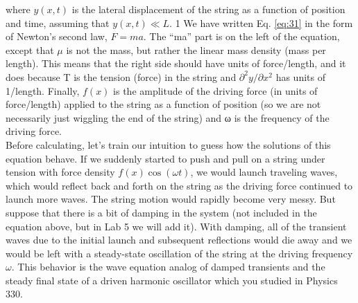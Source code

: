 		where $y(x,t)$ is the lateral displacement of the string as a function of position
and time, assuming that $y(x,t) ≪ L.$
1 We have written Eq. \eqref{eq:31} in the form of
Newton\rq s second law, $F = ma$. The “ma” part is on the left of the equation, except
that $\mu$ is not the mass, but rather the linear mass density (mass per length). This
means that the right side should have units of force/length, and it does because
T is the tension (force) in the string and $\partial^2y / \partial x^2$
 has units of 1/length. Finally,
$f (x)$ is the amplitude of the driving force (in units of force/length) applied to the
string as a function of position (so we are not necessarily just wiggling the end of
the string) and ω is the frequency of the driving force. \\
Before calculating, let\rq s train our intuition to guess how the solutions of this
equation behave. If we suddenly started to push and pull on a string under tension
with force density $f(x)\cos(\omega t)$, we would launch traveling waves, which would
reflect back and forth on the string as the driving force continued to launch more
waves. The string motion would rapidly become very messy. But suppose that
there is a bit of damping in the system (not included in the equation above, but in
Lab 5 we will add it). With damping, all of the transient waves due to the initial
launch and subsequent reflections would die away and we would be left with a
steady-state oscillation of the string at the driving frequency $\omega$. This behavior is
the wave equation analog of damped transients and the steady final state of a
driven harmonic oscillator which you studied in Physics 330.		

